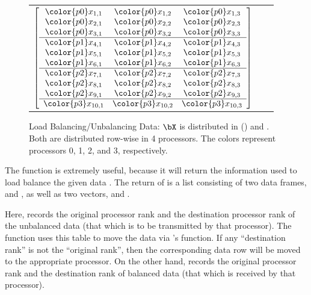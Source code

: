 \begin{figure}[h]
\begin{center}
\begin{tabular}{ccc}
$
\left[
\begin{array}{ccc}
\color{p0}x_{1,1} & \color{p0}x_{1,2} & \color{p0}x_{1,3} \\
\color{p0}x_{2,1} & \color{p0}x_{2,2} & \color{p0}x_{2,3} \\
\color{p0}x_{3,1} & \color{p0}x_{3,2} & \color{p0}x_{3,3} \\ \hline
\color{p1}x_{4,1} & \color{p1}x_{4,2} & \color{p1}x_{4,3} \\
\color{p1}x_{5,1} & \color{p1}x_{5,2} & \color{p1}x_{5,3} \\
\color{p1}x_{6,1} & \color{p1}x_{6,2} & \color{p1}x_{6,3} \\ \hline
\color{p2}x_{7,1} & \color{p2}x_{7,2} & \color{p2}x_{7,3} \\
\color{p2}x_{8,1} & \color{p2}x_{8,2} & \color{p2}x_{8,3} \\
\color{p2}x_{9,1} & \color{p2}x_{9,2} & \color{p2}x_{9,3} \\ \hline
\color{p3}x_{10,1} & \color{p3}x_{10,2} & \color{p3}x_{10,3} \\
\end{array}
\right]
$
\end{tabular}
\end{center}
\caption[Load Balancing/Unbalancing Data]{
Load Balancing/Unbalancing Data:  $\bX$ is distributed in
() and .
Both are distributed row-wise in 4 processors.  The colors represent processors {\color{p0}0},
{\color{p1}1}, {\color{p2}2}, and {\color{p3}3}, respectively.
}
\label{fig:load_balance}
\end{figure}
 

The function  is extremely useful, because it will return the information used to load balance the given data .  The return of  is a list consisting of two data frames,
 and , as well as two vectors,
 and .  

Here,  records the original processor rank and the destination processor rank of the unbalanced data (that which is to be transmitted by that processor).
The 
function uses this table to move the data via 's  function.
If any ``destination rank'' is not the ``original rank'', then the corresponding data row will be moved to the appropriate processor.  On the other hand,  records the original processor rank and the destination rank of balanced data (that which is received by that processor).

